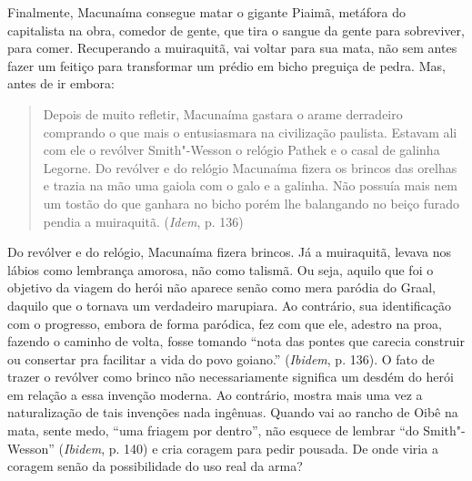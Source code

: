 {Finalmente, Macunaíma consegue matar o gigante Piaimã, metáfora do
capitalista na obra, comedor de gente, que tira o sangue da gente para
sobreviver, para comer. Recuperando a muiraquitã, vai voltar para sua
mata, não sem antes fazer um feitiço para transformar um prédio em bicho
preguiça de pedra. Mas, antes de ir embora:

\begin{quote}
Depois de muito refletir, Macunaíma gastara o arame derradeiro comprando
o que mais o entusiasmara na civilização paulista. Estavam ali com ele o
revólver Smith"-Wesson o relógio Pathek e o casal de galinha Legorne. Do
revólver e do relógio Macunaíma fizera os brincos das orelhas e trazia
na mão uma gaiola com o galo e a galinha. Não possuía mais nem um tostão
do que ganhara no bicho porém lhe balangando no beiço furado pendia a
muiraquitã. (\emph{Idem}, p. 136)
\end{quote}

Do revólver e do relógio, Macunaíma fizera brincos. Já a muiraquitã,
levava nos lábios como lembrança amorosa, não como talismã. Ou seja,
aquilo que foi o objetivo da viagem do herói não aparece senão como mera
paródia do Graal, daquilo que o tornava um verdadeiro marupiara. Ao
contrário, sua identificação com o progresso, embora de forma paródica,
fez com que ele, adestro na proa, fazendo o caminho de volta, fosse
tomando ``nota das pontes que carecia construir ou consertar pra
facilitar a vida do povo goiano.'' (\emph{Ibidem}, p. 136). O fato de
trazer o revólver como brinco não necessariamente significa um desdém do
herói em relação a essa invenção moderna. Ao contrário, mostra mais uma
vez a naturalização de tais invenções nada ingênuas. Quando vai ao
rancho de Oibê na mata, sente medo, ``uma friagem por dentro'', não
esquece de lembrar ``do Smith"-Wesson'' (\emph{Ibidem}, p. 140) e cria
coragem para pedir pousada. De onde viria a coragem senão da
possibilidade do uso real da arma?

}
